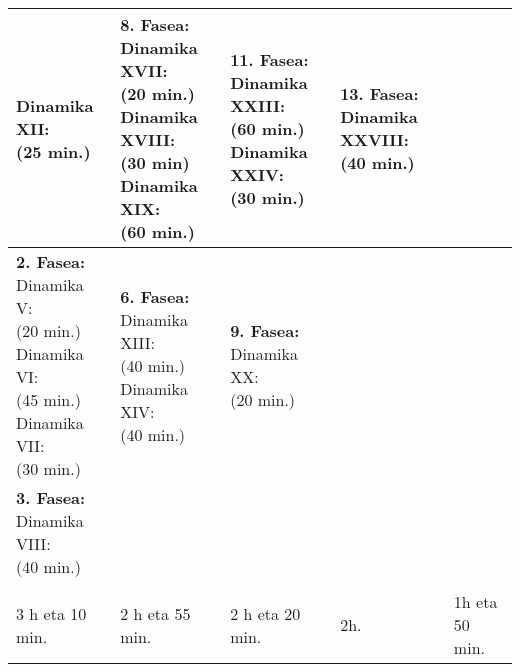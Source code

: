 \begin{center}
\begin{tabular}{|p{3cm}|p{3cm}|p{3cm}|p{3cm}|p{3cm}|}
{        Dinamika XII:\\(25 min.)} &
        \makecell{\textbf{8. Fasea:}\\
        Dinamika XVII:\\(20 min.)\\
        Dinamika XVIII:\\(30 min)\\
        Dinamika XIX:\\(60 min.)} &
        \makecell{\textbf{11. Fasea:}\\
        Dinamika XXIII:\\(60 min.)\\
        Dinamika XXIV:\\(30 min.)} &
        \makecell{\textbf{13. Fasea:}\\
        Dinamika XXVIII:\\(40 min.)}
        \\ \hline
        \makecell{\textbf{2. Fasea:}\\
        Dinamika V:\\(20 min.)\\
        Dinamika VI:\\(45 min.)\\
        Dinamika VII:\\(30 min.)} &
        \makecell{\textbf{6. Fasea:}\\
        Dinamika XIII:\\(40 min.)\\
        Dinamika XIV:\\(40 min.)} &
        \makecell{\textbf{9. Fasea:}\\
        Dinamika XX:\\(20 min.)} &
        \cellcolor[HTML]{F2F2F2} &
        \cellcolor[HTML]{F2F2F2}
        \\ \hline
        \makecell{\textbf{3. Fasea:}\\
        Dinamika VIII:\\(40 min.)} &
        \cellcolor[HTML]{F2F2F2} &
        \cellcolor[HTML]{F2F2F2} &
        \cellcolor[HTML]{F2F2F2} &
        \cellcolor[HTML]{F2F2F2}
        \\ \hline
        \rowcolor[HTML]{D9D9D9}
        \multicolumn{5}{|l|}{\textbf{Saio bakoitzeko denbora totala}}
        \\ \hline
        3 h eta 10 min. & 2 h eta 55 min. & 2 h eta 20 min. & 2h. & 1h eta 50 min.
        \\ \hline
    \end{tabular}
\end{center}

